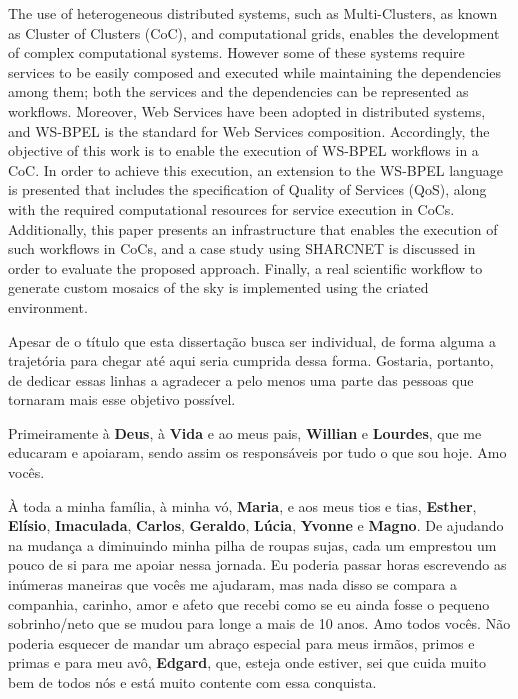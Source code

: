 \documentclass[12pt]{report} %
\begin{document}

    The use of heterogeneous distributed systems, such as Multi-Clusters, as known as Cluster of Clusters (CoC), and computational grids, enables the development of complex computational systems.
    However some of these systems require services to be easily composed and executed while maintaining the dependencies among them;
    both the services and the dependencies can be represented as workflows.
    Moreover, Web Services have been adopted in distributed systems, and WS-BPEL is the standard for Web Services composition.
    Accordingly, the objective of this work is to enable the execution of WS-BPEL workflows in a CoC.
    In order to achieve this execution, an extension to the WS-BPEL language is presented that includes the specification of Quality of Services (QoS), along with the required computational resources for service execution in CoCs.
    Additionally, this paper presents an infrastructure that enables the execution of such workflows in CoCs, and a case study using SHARCNET is discussed in order to evaluate the proposed approach.
    Finally, a real scientific workflow to generate custom mosaics of the sky is implemented using the criated environment.    
   

    Apesar de o título que esta dissertação busca ser individual, de forma alguma a trajetória para chegar até aqui seria cumprida dessa forma.
    Gostaria, portanto, de dedicar essas linhas a agradecer a pelo menos uma parte das pessoas que tornaram mais esse objetivo possível.
    
    Primeiramente à \textbf{Deus}, à \textbf{Vida} e ao meus pais, \textbf{Willian} e \textbf{Lourdes}, que me educaram e apoiaram, sendo assim os responsáveis por tudo o que sou hoje.
    Amo vocês.%
    
    À toda a minha família, à minha vó, \textbf{Maria}, e aos meus tios e tias, \textbf{Esther}, \textbf{Elísio}, \textbf{Imaculada}, \textbf{Carlos}, \textbf{Geraldo}, \textbf{Lúcia}, \textbf{Yvonne} e \textbf{Magno}. 
    De ajudando na mudança a diminuindo minha pilha de roupas sujas, cada um emprestou um pouco de si para me apoiar nessa jornada.
    Eu poderia passar horas escrevendo as inúmeras maneiras que vocês me ajudaram, mas nada disso se compara a companhia, carinho, amor e afeto que recebi como se eu ainda fosse o pequeno sobrinho/neto que se mudou para longe a mais de 10 anos. Amo todos vocês.
    Não poderia esquecer de mandar um abraço especial para meus irmãos, primos e primas e para meu avô, \textbf{Edgard}, que, esteja onde estiver, sei que cuida muito bem de todos nós e está muito contente com essa conquista.    
\end{document}

